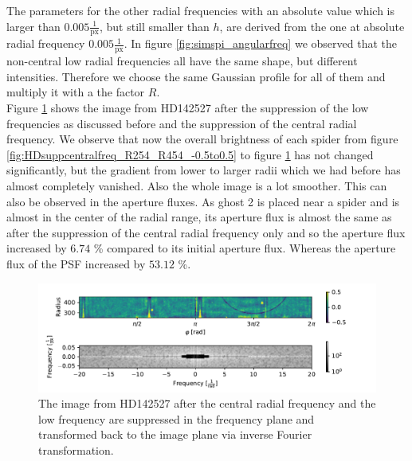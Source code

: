 The parameters for the other radial frequencies with an absolute value which is larger than $0.005 \frac{1}{\mathrm{px}}$, but still smaller than $h$, are derived from the one at absolute radial frequency $0.005 \frac{1}{\mathrm{px}}$. In figure \ref{fig:simspi_angularfreq} we observed that the non-central low radial frequencies all have the same shape, but different intensities. Therefore we choose the same Gaussian profile for all of them and multiply it with a the factor $R$.\\
Figure \ref{fig:HDsupplowfreq_R254_R454_-0.5to0.5.pdf} shows the image from HD142527 after the suppression of the low frequencies as discussed before and the suppression of the central radial frequency. We observe that now the overall brightness of each spider from figure \ref{fig:HDsuppcentralfreq_R254_R454_-0.5to0.5} to figure \ref{fig:HDsupplowfreq_R254_R454_-0.5to0.5.pdf} has not changed significantly, but the gradient from lower to larger radii which we had before has almost completely vanished. Also the whole image is a lot smoother. This can also be observed in the aperture fluxes. As ghost 2 is placed near a spider and is almost in the center of the radial range, its aperture flux is almost the same as after the suppression of the central radial frequency only and so the aperture flux increased by $6.74$ \% compared to its initial aperture flux. Whereas the aperture flux of the PSF increased by $53.12$ \%. 
\begin{figure}[H]
	\centering
		\includegraphics[width=1.1\textwidth]{pics/HDsupplowfreq_R254_R454_-0.5to0.5.pdf}
		\caption{The image from HD142527 after the central radial frequency and the low frequency are suppressed in the frequency plane and transformed back to the image plane via inverse Fourier transformation.}
		\label{fig:HDsupplowfreq_R254_R454_-0.5to0.5.pdf}
\end{figure}

